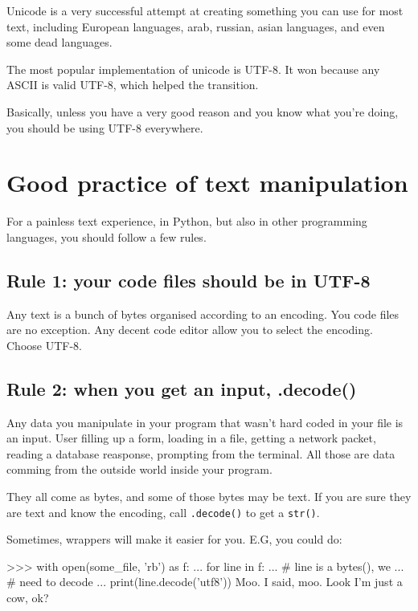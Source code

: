 Unicode is a very successful attempt at creating something you can use for most text, including European languages, arab, russian, asian languages, and even some dead languages.

The most popular implementation of unicode is UTF-8. It won because any ASCII is valid UTF-8, which helped the transition.

Basically, unless you have a very good reason and you know what you're doing, you should be using UTF-8 everywhere.

\section{Good practice of text manipulation}

For a painless text experience, in Python, but also in other programming languages, you should follow a few rules.

\subsection{Rule 1: your code files should be in UTF-8}

Any text is a bunch of bytes organised according to an encoding. You code files are no exception. Any decent code editor allow you to select the encoding. Choose UTF-8.

\subsection{Rule 2: when you get an input, .decode()}

Any data you manipulate in your program that wasn't hard coded in your file is an input. User filling up a form, loading in a file, getting a network packet, reading a database reasponse, prompting from the terminal. All those are data comming from the outside world inside your program.

They all come as bytes, and some of those bytes may be text. If you are sure they are text and know the encoding, call \lstinline{.decode()} to get a \lstinline{str()}.

Sometimes, wrappers will make it easier for you. E.G, you could do:

\begin{py3}
>>> with open(some_file, 'rb') as f:
...     for line in f:
...         # line is a bytes(), we
...         # need to decode
...         print(line.decode('utf8'))
Moo.
I said, moo.
Look I'm just a cow, ok?
\end{py3}

